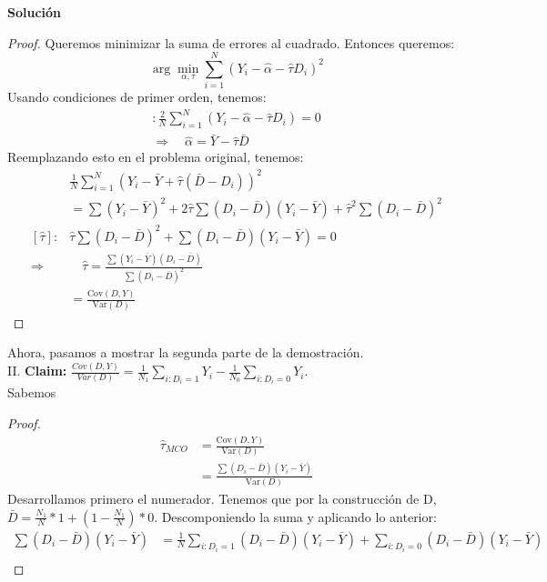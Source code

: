 \documentclass[a4paper, answers, addpoints, 11pt]{exam}
\newenvironment{solucion}{%
  \begin{mdframed}[
    backgroundcolor=blue!5,    %
    linecolor=blue!50,          %
    linewidth=2pt,              %
    leftmargin=10pt,            %
    rightmargin=8pt,           %
    topline=true,              %
    bottomline=true,            %
    roundcorner=10pt,           %
    innerleftmargin=10pt,       %
    innerrightmargin=10pt,      %
    innerbottommargin=10pt,     %
    innertopmargin=10pt         %
  ]%
  \begin{tcolorbox}[colframe=blue!50!black, colback=blue!50, coltitle=white, sharp corners=all, boxrule=1mm, width=\textwidth, halign=left, valign=center, top=0mm, bottom=0mm, left=0mm, right=0mm] \textbf{Solución} \end{tcolorbox} }{\end{mdframed}}
\begin{document}
\begin{itemize}
\begin{solucion}
\begin{proof}
Queremos minimizar la suma de errores al cuadrado. Entonces queremos:
\begin{equation*}
    \arg \min_{\alpha, \tau} \sum_{i=1}^{N} (Y_i - \hat{\alpha }- \hat{\tau} D_i)^2 
\end{equation*}
Usando condiciones de primer orden, tenemos:
    \begin{align*}
    [\hat{\alpha }]:  \frac{2}{N} \sum_{i=1}^{N} (Y_i - \hat{\alpha } - \hat{\tau} D_i) = 0\\
    \Rightarrow  \quad \hat{\alpha } = \bar{Y} - \hat{\tau}\bar{D}  
    \end{align*}
Reemplazando esto en el problema original, tenemos:
    \begin{align*}
    & \frac{1}{N} \sum_{i=1}^{N} (Y_i - \bar{Y} + \hat{\tau} (\bar{D} - D_i))^2 \\ 
    &= \sum (Y_i - \bar{Y})^2 + 2\hat{\tau} \sum (D_i - \bar{D})(Y_i - \bar{Y}) +\hat{\tau}^2 \sum (D_i - \bar{D})^2 \\  
    [\hat{\tau}]: &  \hat{\tau}\sum (D_i - \bar{D})^2 + \sum (D_i - \bar{D})(Y_i - \bar{Y}) = 0 \\  
    \Rightarrow & \quad \hat{\tau} = \frac{\sum (Y_i - \bar{Y})(D_i - \bar{D})}{\sum (D_i - \bar{D})^2} \\  
    &= \frac{\text{Cov}(D, Y)}{\text{Var}(D)} 
\end{align*}
\end{proof}
    Ahora, pasamos a mostrar la segunda parte de la demostración.\\
     II.  \textbf{Claim:} $\frac{Cov(D, Y)}{Var(D)}= \frac{1}{N_1}\sum_{{i : D_i = 1}} Y_i - \frac{1}{N_0}\sum_{{i : D_i = 0}} Y_i $.\\
     Sabemos
     \begin{proof}
      \begin{align*}
    \hat{\tau}_{MCO} &= \frac{\text{Cov}(D, Y)}{\text{Var}(D)} \\
    &=\frac{\sum (D_i - \bar{D})(Y_i - \bar{Y})}{\text{Var}(D)} 
    \end{align*}
    Desarrollamos primero el numerador. Tenemos que por la construcción de D,  $\bar{D}=\frac{N_1}{N}*1+ (1 - \frac{N_1}{N})*0 $. Descomponiendo la suma y aplicando lo anterior:
    \begin{align*}
\sum (D_i - \bar{D})(Y_i - \bar{Y})
    &= \frac{1}{N} \sum_{i:D_i=1} (D_i - \bar{D})(Y_i - \bar{Y}) + \sum_{i:D_i=0} (D_i - \bar{D})(Y_i - \bar{Y}) \\  

\end{align*}
\end{proof}
\end{solucion}
\end{itemize}
\end{document}
